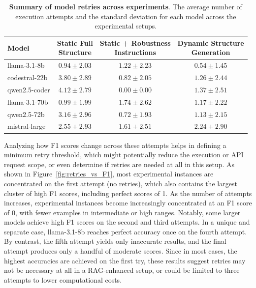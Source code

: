 \documentclass{DESSThesis}
\begin{document}
\begin{table}[h]
    \centering
    \renewcommand{\arraystretch}{1.2}
    \setlength{\tabcolsep}{10pt}
    \begin{tabular}{lccc}
        \hline
        \textbf{Model} & 
        \makecell{\textbf{Static Full} \\ \textbf{Structure}} & 
        \makecell{\textbf{Static + Robustness} \\ \textbf{Instructions}} & 
        \makecell{\textbf{Dynamic Structure} \\ \textbf{Generation}} \\
        \hline
        llama-3.1-8b & $0.94 \pm 2.03$ & $1.22 \pm 2.23$ & $0.54 \pm 1.45$ \\
        codestral-22b & $3.80 \pm 2.89$ & $0.82 \pm 2.05$ & $1.26 \pm 2.44$ \\
        qwen2.5-coder & $4.12 \pm 2.79$ & $0.00 \pm 0.00$ & $1.37 \pm 2.51$ \\
        llama-3.1-70b & $0.99 \pm 1.99$ & $1.74 \pm 2.62$ & $1.17 \pm 2.22$ \\
        qwen2.5-72b & $3.16 \pm 2.96$ & $0.72 \pm 1.93$ & $1.13 \pm 2.15$ \\
        mistral-large & $2.55 \pm 2.93$ & $1.61 \pm 2.51$ & $2.24 \pm 2.90$ \\
        \hline
    \end{tabular}
    \caption[Summary of model retries across experiments]{\textbf{Summary of model retries across experiments}. The average number of execution attempts and the standard deviation for each model across the experimental setups.}
    \label{tab:retry_mean_and_st_deviation}
\end{table}

Analyzing how F1 scores change across these attempts helps in defining a minimum retry threshold, which might potentially reduce the execution or API request scope, or even determine if retries are needed at all in this setup. As shown in Figure~\ref{fig:retries_vs_F1}, most experimental instances are concentrated on the first attempt (no retries), which also contains the largest cluster of high F1 scores, including perfect scores of 1. As the number of attempts increases, experimental instances become increasingly concentrated at an F1 score of 0, with fewer examples in intermediate or high ranges. Notably, some larger models achieve high F1 scores on the second and third attempts. In a unique and separate case, llama-3.1-8b reaches perfect accuracy once on the fourth attempt. By contrast, the fifth attempt yields only inaccurate results, and the final attempt produces only a handful of moderate scores. Since in most cases, the highest accuracies are achieved on the first try, these results suggest retries may not be necessary at all in a RAG-enhanced setup, or could be limited to three attempts to lower computational costs.
\end{document}
